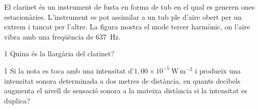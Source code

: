 El clarinet és un instrument de fusta en forma de tub en el qual es generen ones estacionàries. L'ins\-tru\-ment es pot assimilar a un tub ple d'aire obert per un extrem i tancat per l'altre. La figura mostra el mode tercer harmònic, on l'aire vibra amb una freqüència de 637~Hz.


\begin{apartat}{1}
Quina és la llargària del clarinet?
\end{apartat}

\begin{apartat}{1}
Si la nota es toca amb una intensitat d'$1,00\times 10^{-5}\ \mathrm{W\,m^{-2}}$ i produeix una intensitat sonora determinada a dos metres de distància, en quants decibels augmenta el nivell de sensació sonora a la mateixa distància si la intensitat es duplica?
\end{apartat}

